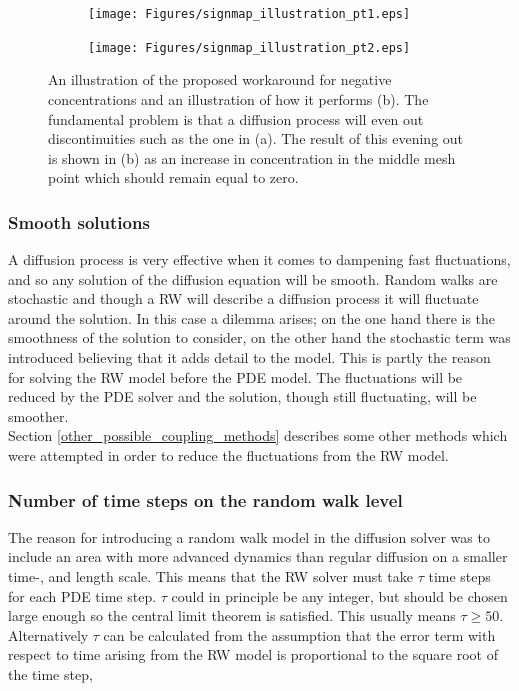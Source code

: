   
\begin{figure}[H]
\centering
\begin{subfigure}[t!]{0.48\textwidth}
 \texttt{[image: Figures/signmap\_illustration\_pt1.eps]}
 \caption{}
\end{subfigure}
\begin{subfigure}[t!]{0.48\textwidth}
 \texttt{[image: Figures/signmap\_illustration\_pt2.eps]}
 \caption{}
\end{subfigure}
\caption[Workaround for negative concentrations, illustration]{An illustration of the proposed workaround for negative concentrations and an illustration of how it performs (b). The fundamental problem is that a diffusion process will even out discontinuities such as the one in (a). The result of this evening out is shown in (b) as an increase in concentration in the middle mesh point which should remain equal to zero.}
\label{theory:signmap_illustration}
 \end{figure}

\subsubsection{Smooth solutions}

 A diffusion process is very effective when it comes to dampening fast fluctuations, and so any solution of the diffusion equation will be smooth. 
 Random walks are stochastic and though a RW will describe a diffusion process it will fluctuate around the solution. 
 In this case a dilemma arises; on the one hand there is the smoothness of the solution to consider, on the other hand the stochastic term was introduced believing that it adds detail to the model. 
This is partly the reason for solving the RW model before the PDE model. 
The fluctuations will be reduced by the PDE solver and the solution, though still fluctuating, will be smoother. \\

Section \ref{other_possible_coupling_methods} describes some other methods which were attempted in order to reduce the fluctuations from the RW model.

\subsubsection{Number of time steps on the random walk level}
The reason for introducing a random walk model in the diffusion solver was to include an area with more advanced dynamics than regular diffusion on a smaller time-, and length scale. 
This means that the RW solver must take $\tau$ time steps for each PDE time step. 
$\tau$ could in principle be any integer, but should be chosen large enough so the central limit theorem is satisfied. 
This usually means $\tau\geq50$. \\
Alternatively $\tau$ can be calculated from the assumption that the error term with respect to time arising from the RW model is proportional to the square root of the time step, 

